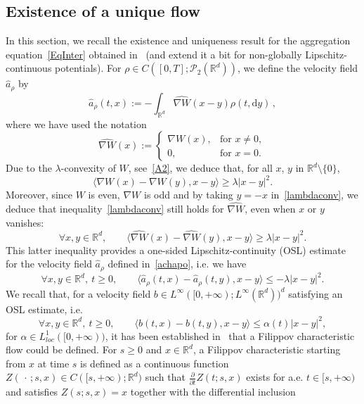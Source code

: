 \documentclass[11pt]{article}
\theoremstyle{definition}
\numberwithin{equation}{section}
\newcommand*{\dd}{\mathrm{d}}
\newcommand*{\dy}{\dd y}
\newcommand*\RR{\mathbb{R}}
\newcommand*\pa{\partial}
\newcommand*\calP{{\mathcal P}}
\newcommand*\achapo{\widehat{a}}
\newcommand*\nabWchapo{\widehat{\nabla W}}
\let\oldforall\forall
\renewcommand*{\forall}{\mathrel{\oldforall}}
\begin{document}
\subsection{Existence of a unique flow}

In this section, we recall the existence and uniqueness result for the aggregation equation~\eqref{EqInter} obtained in~\cite{CJLV} (and extend it a bit for non-globally Lipschitz-continuous potentials). For $\rho \in C([0,T];\calP_2(\RR^d))$, we define the velocity field $\widehat{a}_{\rho}$ by
\begin{equation}\label{achapo}
\achapo_{\rho}(t,x) := -\int_{\RR^d} \nabWchapo(x-y) \rho(t,\dy)\,,
\end{equation}
where we have used the notation
\[
\nabWchapo(x):=
\begin{cases} 
\nabla W(x), & \text{for } x\neq 0,\\
0, & \text{for } x=0.
\end{cases}
\]
Due to the $\lambda$-convexity of $W$, see~\eqref{A2}, we deduce that, for all $x$, $y$ in $\RR^d\setminus \{0\}$,
\begin{equation}\label{lambdaconv}
\langle \nabla W(x)-\nabla W(y), x-y\rangle \geq \lambda |x-y|^2.
\end{equation}
Moreover, since $W$ is even, $\nabla W$ is odd and by taking $y=-x$ in~\eqref{lambdaconv}, we deduce that inequality~\eqref{lambdaconv} still holds for $\nabWchapo$, even when $x$ or $y$ vanishes:
\begin{equation}\label{lambdaconvWchapo}
\forall x,y\in\RR^d, \qquad
\langle\nabWchapo(x)-\nabWchapo(y),x-y\rangle \geq \lambda |x-y|^2.
\end{equation}
This latter inequality provides a one-sided Lipschitz-continuity (OSL) estimate for the velocity field $\achapo_\rho$ defined in~\eqref{achapo}, i.e. we have
\begin{equation*}
\forall x,y\in\RR^d, \ t \geq 0, \qquad
\langle \achapo_{\rho}(t,x)-\achapo_{\rho}(t,y), x-y\rangle \leq -\lambda |x-y|^2.
\end{equation*}
We recall that, for a velocity field $b\in L^\infty([0,+\infty);L^\infty(\RR^d))^d$ satisfying an OSL estimate, i.e.
\[
\forall x,y\in \RR^d,\ t \geq 0, \qquad
\langle b(t,x)-b(t,y),x-y\rangle \leq \alpha(t) |x-y|^2,
\]
for $\alpha\in L^1_{loc}([0,+\infty))$, it has been established in~\cite{Filippov} that a Filippov characteristic flow could be defined. For $s\geq 0$ and $x\in \RR^d$, a Filippov characteristic starting from $x$ at time $s$ is defined as a continuous function $Z({\,\cdot\,};s,x)\in C([s,+\infty);\RR^d)$ such that $\frac{\pa}{\pa t}Z(t;s,x)$ exists for a.e. $t\in[s,+\infty)$ and satisfies $Z(s;s,x)=x$ together with the differential inclusion
\end{document}
